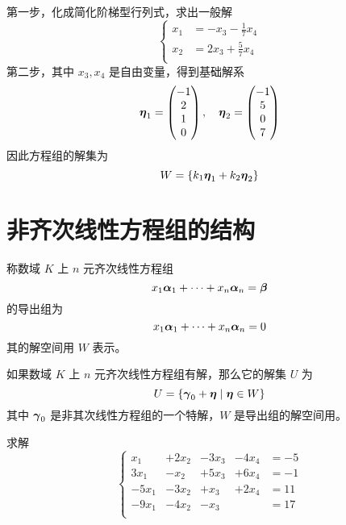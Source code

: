 第一步，化成简化阶梯型行列式，求出一般解
\[ \left\{
	\begin{aligned}
		x_1 & = -x_3 - \frac{1}{7}x_4 \\
		x_2 & = 2x_3 + \frac{5}{7}x_4 \\
	\end{aligned} \right. \]
第二步，其中 $x_3, x_4$ 是自由变量，得到基础解系
\[ \boldsymbol{\eta}_1 = \left(\begin{matrix}
			-1 \\ 2 \\ 1 \\ 0
		\end{matrix}\right), \quad \boldsymbol{\eta}_2 = \left(\begin{matrix}
			-1 \\ 5 \\ 0 \\ 7
		\end{matrix}\right) \]
因此方程组的解集为
\[ W = \{ k_1 \boldsymbol{\eta}_1 + k_2 \boldsymbol{\eta}_2 \} \]

\section{非齐次线性方程组的结构}

称数域 $K$ 上 $n$ 元齐次线性方程组
\[x_1\boldsymbol{\alpha}_1 + \cdots + x_n\boldsymbol{\alpha}_n = \boldsymbol{\beta}\]
的导出组为
\[x_1\boldsymbol{\alpha}_1 + \cdots + x_n\boldsymbol{\alpha}_n = 0\]
其的解空间用 $W$ 表示。

\begin{theorem}
	如果数域 $K$ 上 $n$ 元齐次线性方程组有解，那么它的解集 $U$ 为
	\[U = \{\boldsymbol{\gamma}_0 + \boldsymbol{\eta} \mid \boldsymbol{\eta} \in W\}\]
	其中 $\boldsymbol{\gamma}_0$ 是非其次线性方程组的一个特解，$W$ 是导出组的解空间用。
\end{theorem}

\begin{example}
	求解
	\[ \left\{
		\begin{aligned}
			x_1   & + 2x_2 & - 3x_3 & - 4x_4 & = -5 \\
			3x_1  & - x_2  & + 5x_3 & + 6x_4 & = -1 \\
			-5x_1 & - 3x_2 & + x_3  & + 2x_4 & = 11 \\
			-9x_1 & - 4x_2 & - x_3  &        & = 17 \\
		\end{aligned} \right. \]
\end{example}

